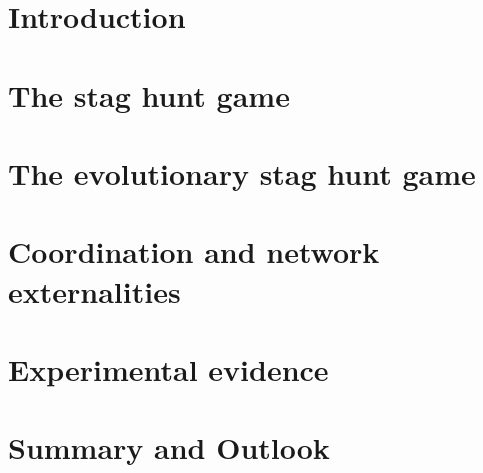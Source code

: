 \documentclass[11pt]{article}
\begin{document}
%

%
%
%
\tableofcontents
\newpage
\listoffigures
\newpage
{}

%
%
\section{Introduction}

%
%
%
\section{The stag hunt game}

%
%
%
\section{The evolutionary stag hunt game}

%
%
%
%
%
%
\section{Coordination and network externalities}

%
%
%
%
\section{Experimental evidence}

%
%
%
%
%
%
\section{Summary and Outlook}

%
%
\end{document}
